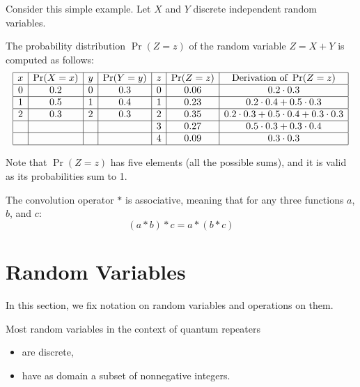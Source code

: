 \documentclass{masterthesis}
\begin{document}
Consider this simple example. Let $X$ and $Y$ discrete independent random variables. 

The probability distribution $\Pr(Z = z)$ of the random variable $Z = X + Y$ is computed as follows:
\begin{equation*}
    \begin{array}{|c|c|c|c|c|c|c|}
        \hline
        x & \Pr(X = x) & y & \Pr(Y = y) & z & \Pr(Z = z) & \text{Derivation of }\Pr(Z = z)\\
        \hline
        0 & 0.2 & 0 & 0.3 & 0 & 0.06 & 0.2 \cdot 0.3 \\
        \hline
        1 & 0.5 & 1 & 0.4 & 1 & 0.23 & 0.2 \cdot 0.4 + 0.5 \cdot 0.3 \\
        \hline
        2 & 0.3 & 2 & 0.3 & 2 & 0.35 & 0.2 \cdot 0.3 + 0.5 \cdot 0.4 + 0.3 \cdot 0.3 \\
        \hline
         &  &  &  & 3 & 0.27 & 0.5 \cdot 0.3 + 0.3 \cdot 0.4 \\
        \hline
         &  &  &  & 4 & 0.09 & 0.3 \cdot 0.3 \\
        \hline
    \end{array}
\end{equation*}

Note that $\Pr(Z = z)$ has five elements (all the possible sums), and it is valid as its probabilities sum to 1.

\begin{samepage}\label{page:convolution_associativity}
    The convolution operator \( * \) is associative, meaning that for any three functions \(a\), \(b\), and \(c\):
    \begin{equation}
        (a * b) * c = a * (b * c)
    \end{equation}        
\end{samepage}

\section*{Random Variables}

In this section, we fix notation on random variables and operations on them. 

Most random variables in the context of quantum repeaters
\begin{itemize}
    \item are discrete,
    \item have as domain a subset of nonnegative integers.
\end{itemize}
\end{document}
